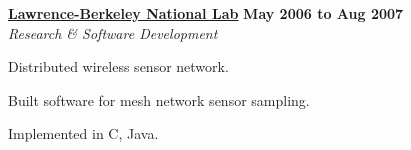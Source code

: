 \halfblankline

\href{http://www.lbl.gov/}{\textbf{Lawrence-Berkeley National Lab}} \hfill \textbf{May 2006 to Aug 2007}\\
\textit{Research \& Software Development}
\begin{innerlist}
  \item Distributed wireless sensor network.
  \item Built software for mesh network sensor sampling.
  \item Implemented in C, Java.
\end{innerlist}

%
%
%
%
